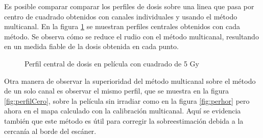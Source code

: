 Es posible comparar comparar los perfiles de dosis sobre una linea que pasa por centro de cuadrado obtenidos con canales individuales y usando el método multicanal. En la figura \ref{fig:perfilesMapaCuadrado} se muestran perfiles centrales obtenidos con cada método. Se observa cómo se reduce el rudio con el método multicanal, resultando en un medida fiable de la dosis obtenida en cada punto. 
\begin{figure}[H]
	\centering
	\hfill
	\caption{Perfil central de dosis en película con cuadrado de 5 Gy}
	\label{fig:perfilesMapaCuadrado}
\end{figure}

Otra manera de observar la superioridad del método multicanal sobre el método de un solo canal es observar el mismo perfil, que se muestra en la figura \ref{fig:perfilCero}, sobre la película sin irradiar como en la figura \ref{fig:perhor} pero ahora en el mapa calculado con la calibración multicanal. Aquí se evidencia también que este método es útil para corregir la sobreestimación debida a la cercanía al borde del escáner.\\

